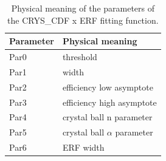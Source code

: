 \begin{table}[htb]
\caption[Physical meaning of the parameters of the CRYS\_CDF x ERF fitting function]{\label{tab:trigpar}Physical meaning of the parameters of the CRYS\_CDF x ERF fitting function.}
\centering
\begin{tabularx}{\textwidth}{XX}
	\hline
	Parameter & Physical meaning                \\
	\hline
	Par0      & threshold                       \\
	Par1      & width                           \\
	Par2      & efficiency low asymptote        \\
	Par3      & efficiency high asymptote       \\
	Par4      & crystal ball n parameter        \\
	Par5      & crystal ball $\alpha$ parameter \\
	Par6      & ERF width                       \\
	\hline
\end{tabularx}
\end{table}

\clearpage

